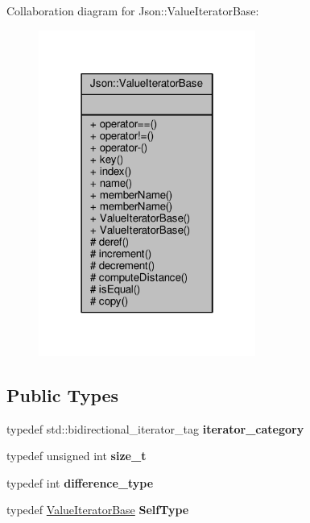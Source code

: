 Collaboration diagram for Json\+:\+:Value\+Iterator\+Base\+:
\nopagebreak
\begin{figure}[H]
\begin{center}
\leavevmode
\includegraphics[width=202pt]{d0/ddf/classJson_1_1ValueIteratorBase__coll__graph}
\end{center}
\end{figure}
\subsection*{Public Types}
\begin{DoxyCompactItemize}
\item 
typedef std\+::bidirectional\+\_\+iterator\+\_\+tag {\bfseries iterator\+\_\+category}\hypertarget{classJson_1_1ValueIteratorBase_a02fd11a4fbdc0007da1e8bcf5e6b83c3}{}\label{classJson_1_1ValueIteratorBase_a02fd11a4fbdc0007da1e8bcf5e6b83c3}

\item 
typedef unsigned int {\bfseries size\+\_\+t}\hypertarget{classJson_1_1ValueIteratorBase_a9d3a3c7ce5cdefe23cb486239cf07bb5}{}\label{classJson_1_1ValueIteratorBase_a9d3a3c7ce5cdefe23cb486239cf07bb5}

\item 
typedef int {\bfseries difference\+\_\+type}\hypertarget{classJson_1_1ValueIteratorBase_a4e44bf8cbd17ec8d6e2c185904a15ebd}{}\label{classJson_1_1ValueIteratorBase_a4e44bf8cbd17ec8d6e2c185904a15ebd}

\item 
typedef \hyperlink{classJson_1_1ValueIteratorBase}{Value\+Iterator\+Base} {\bfseries Self\+Type}\hypertarget{classJson_1_1ValueIteratorBase_a9d2a940d03ea06d20d972f41a89149ee}{}\label{classJson_1_1ValueIteratorBase_a9d2a940d03ea06d20d972f41a89149ee}

\end{DoxyCompactItemize}
